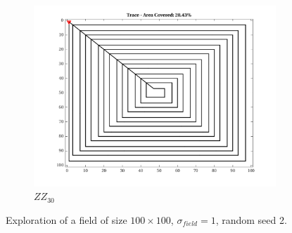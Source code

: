 \begin{figure}[htb!]
    \begin{subfigure}[t]{0.25\textwidth}
        \centering
        \includegraphics[width=\linewidth]{figures/path_zz_30p_100x100_sf_1_seed_2.png}
        \captionsetup{skip=0.20\baselineskip,size=footnotesize}
        \caption{$ZZ_{30}$}
    \end{subfigure}%
    \captionsetup{skip=0.20\baselineskip}
    \caption{Exploration of a field of size $100 \times 100$, $\sigma_{field} = 1$, random seed 2.}
    \label{fig:sf1}
\end{figure}

